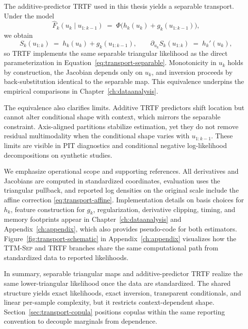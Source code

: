 \documentclass[11pt,a4paper,twoside]{book}\usepackage[]{graphicx}\usepackage[]{xcolor}
\begin{document}
The additive-predictor TRTF used in this thesis yields a separable transport. Under the model
\begin{equation}
  \widehat F_k(u_k \mid u_{1:k-1}) \;=\; \Phi\!\big(h_k(u_k) + g_k(u_{1:k-1})\big),\label{eq:transport-trtf-additive}
\end{equation}
we obtain
\begin{equation}
  S_k(u_{1:k}) \;=\; h_k(u_k) + g_k(u_{1:k-1}),\qquad \partial_{u_k}S_k(u_{1:k}) \;=\; h_k'(u_k),\label{eq:transport-trtf-separable}
\end{equation}
so TRTF implements the same separable triangular likelihood as the direct parameterization in Equation~\eqref{eq:transport-separable}. Monotonicity in $u_k$ holds by construction, the Jacobian depends only on $u_k$, and inversion proceeds by back-substitution identical to the separable map. This equivalence underpins the empirical comparisons in Chapter~\ref{ch:dataanalysis}.

The equivalence also clarifies limits. Additive TRTF predictors shift location but cannot alter conditional shape with context, which mirrors the separable constraint. Axis-aligned partitions stabilize estimation, yet they do not remove residual multimodality when the conditional shape varies with $u_{1:k-1}$. These limits are visible in PIT diagnostics and conditional negative log-likelihood decompositions on synthetic studies.

We emphasize operational scope and supporting references. All derivatives and Jacobians are computed in standardized coordinates, evaluation uses the triangular pullback, and reported log densities on the original scale include the affine correction \eqref{eq:transport-affine}. Implementation details on basis choices for $h_k$, feature construction for $g_k$, regularization, derivative clipping, timing, and memory footprints appear in Chapter~\ref{ch:dataanalysis} and Appendix~\ref{ch:appendix}, which also provides pseudo-code for both estimators. Figure~\ref{fig:transport-schematic} in Appendix~\ref{ch:appendix} visualizes how the \textsc{TTM-Sep} and \textsc{TRTF} branches share the same computational path from standardized data to reported likelihoods.

In summary, separable triangular maps and additive-predictor TRTF realize the same lower-triangular likelihood once the data are standardized. The shared structure yields exact likelihoods, exact inversion, transparent conditionals, and linear per-sample complexity, but it restricts context-dependent shape. Section~\ref{sec:transport-copula} positions copulas within the same reporting convention to decouple marginals from dependence.
\end{document}
